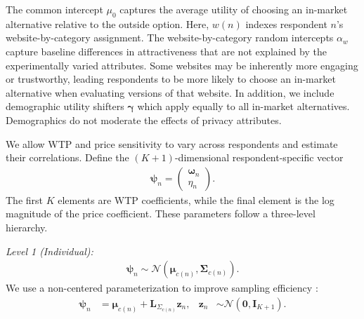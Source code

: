 \documentclass[12pt]{article}
\theoremstyle{definition}
\theoremstyle{remark}
\begin{document}
\begin{appendix}
The common intercept $\mu_0$ captures the average utility of choosing an in-market alternative relative to the outside option. Here, $w(n)$ indexes respondent $n$'s website-by-category assignment. The website-by-category random intercepts $\alpha_w$ capture baseline differences in attractiveness that are not explained by the experimentally varied attributes. Some websites may be inherently more engaging or trustworthy, leading respondents to be more likely to choose an in-market alternative when evaluating versions of that website. In addition, we include demographic utility shifters $\boldsymbol{\gamma}$ which apply equally to all in-market alternatives. Demographics do not moderate the effects of privacy attributes.

We allow WTP and price sensitivity to vary across respondents and estimate their correlations. Define the $(K+1)$-dimensional respondent-specific vector
\begin{align*}
    \boldsymbol{\psi}_n
    =
    \begin{pmatrix}
      \boldsymbol{\omega}_n \\
      \eta_n
    \end{pmatrix}.
\end{align*}
The first $K$ elements are WTP coefficients, while the final element is the log magnitude of the price coefficient. These parameters follow a three-level hierarchy.

\emph{Level 1 (Individual):}
\begin{align*}
    \boldsymbol{\psi}_n
    \sim
    \mathcal{N}
    \left(
      \boldsymbol{\mu}_{c(n)},
      \boldsymbol{\Sigma}_{c(n)}
    \right).
\end{align*}
We use a non-centered parameterization to improve sampling efficiency \citep{papaspiliopoulos2007general}:
\begin{align*}
    \boldsymbol{\psi}_n
    &=
    \boldsymbol{\mu}_{c(n)}
    +
    \mathbf L_{\Sigma_{c(n)}}\bm z_n,
    &
    \bm z_n
    &\sim
    \mathcal{N}
    \left(
      \mathbf{0},
      \mathbf{I}_{K+1}
    \right).
\end{align*}


\end{appendix}
\end{document}
